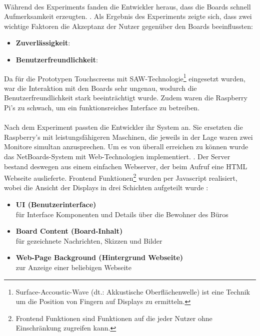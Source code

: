\\
Während des Experiments fanden die Entwickler heraus, dass die Boards schnell Aufmerksamkeit erzeugten. .
Als Ergebnis des Experiments zeigte sich, dass zwei wichtige Faktoren die Akzeptanz der Nutzer gegenüber den Boards beeinflussten:
\begin{itemize}
  \item \textbf{Zuverlässigkeit}: 
  \item \textbf{Benutzerfreundlichkeit}: 
\end{itemize}
Da für die Prototypen Touchscreens mit SAW-Technologie\footnote{Surface-Accoustic-Wave (dt.: Akkustische Oberflächenwelle) ist eine Technik um die Position von Fingern auf Displays zu ermitteln.} eingesetzt wurden, war die Interaktion mit den Boards sehr ungenau, wodurch die Benutzerfreundlichkeit stark beeinträchtigt wurde.
Zudem waren die Raspberry Pi's zu schwach, um ein funktionsreiches Interface zu betreiben.
\\
\\
Nach dem Experiment passten die Entwickler ihr System an.
Sie ersetzten die Raspberry's mit leistungsfähigeren Maschinen, die jeweils in der Lage waren zwei Monitore simultan anzusprechen.
Um es von überall erreichen zu können wurde das NetBoards-System mit Web-Technologien implementiert. .
Der Server bestand deswegen aus einem einfachen Webserver, der beim Aufruf eine HTML Webseite auslieferte. Frontend Funktionen\footnote{Frontend Funktionen sind Funktionen auf die jeder Nutzer ohne Einschränkung zugreifen kann.} wurden per Javascript realisiert, wobei die Ansicht der Displays in drei Schichten aufgeteilt wurde \cite{wood:2014}:
\begin{itemize}
  \item \textbf{UI (Benutzerinterface)}\\
    für Interface Komponenten und Details über die Bewohner des Büros
  \item \textbf{Board Content (Board-Inhalt)}\\
    für gezeichnete Nachrichten, Skizzen und Bilder
  \item \textbf{Web-Page Background (Hintergrund Webseite)}\\
    zur Anzeige einer beliebigen Webseite
\end{itemize}
